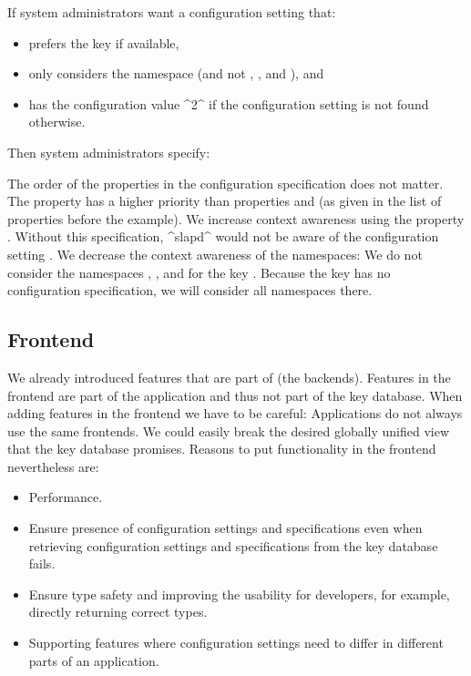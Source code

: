 \begin{example}
If system administrators want a configuration setting that:
\begin{itemize}
\item prefers the key  if available,
\item only considers the namespace  (and not , , and ), and
\item has the configuration value ^2^ if the configuration setting is not found otherwise.
\end{itemize}
Then system administrators specify:
\par
{}
\par
The order of the properties in the configuration specification does not matter.
The property  has a higher priority than properties  and  (as given in the list of properties before the example).
We increase context awareness using the property .
Without this specification, ^slapd^ would not be aware of the configuration setting .
We decrease the context awareness of the namespaces:
We do not consider the namespaces , , and  for the key .
Because the key  has no configuration specification, we will consider all namespaces there.
\end{example}

\subsection{Frontend}

We already introduced features that are part of  (the backends).
Features in the frontend are part of the application and thus not part of the key database.
When adding features in the frontend we have to be careful:
Applications do not always use the same frontends.
We could easily break the desired globally unified view that the key database promises.
Reasons to put functionality in the frontend nevertheless are:

\begin{itemize}
\item Performance.
\item Ensure presence of configuration settings and specifications even when retrieving configuration settings and specifications from the key database fails.
\item Ensure type safety and improving the usability for developers, for example, directly returning correct types.
\item Supporting features where configuration settings need to differ in different parts of an application.
\end{itemize}

